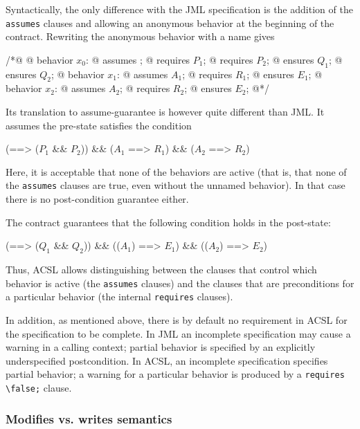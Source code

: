 \noindent
Syntactically, the only difference with the JML specification is the
addition of the \lstinline|assumes| clauses and allowing an 
anonymous behavior at the beginning of the contract. Rewriting the anonymous behavior with a name gives

\begin{listing}{1}
	/*@ 
	@ behavior $x_0$:
	@   assumes \true;
	@   requires $P_1$;
	@   requires $P_2$;
	@   ensures  $Q_1$;
	@   ensures  $Q_2$;
	@ behavior $x_1$:
	@   assumes $A_1$;
	@   requires $R_1$;
	@   ensures $E_1$;
	@ behavior $x_2$:
	@   assumes $A_2$;
	@   requires $R_2$;
	@   ensures $E_2$;
	@*/
\end{listing}

\noindent
Its translation to assume-guarantee is however quite different than JML.
It assumes the pre-state satisfies the condition

\begin{listing-nonumber}
  (\true ==> ($P_1$ && $P_2$)) && ($A_1$ ==> $R_1$) && ($A_2$ ==> $R_2$)
\end{listing-nonumber}
Here, it is acceptable that none of the behaviors are active (that is, that none of the \lstinline|assumes| clauses are true, even without the unnamed behavior). In that case there is no post-condition guarantee either.

The contract guarantees that the following condition holds in the post-state:

\begin{listing-nonumber}
(\true ==> ($Q_1$ && $Q_2$)) && (\old($A_1$) ==> $E_1$) && (\old($A_2$) ==> $E_2$)
\end{listing-nonumber}

Thus, ACSL allows distinguishing between the clauses that control
which behavior is active (the \lstinline|assumes| clauses) and the
clauses that are preconditions for a particular behavior (the internal
\lstinline|requires| clauses). 

In addition, as mentioned above, there is
by default no requirement in ACSL for the specification to be complete. In JML an incomplete specification may cause a warning in a calling context; partial behavior is specified by an explicitly underspecified postcondition. In ACSL, an incomplete specification specifies partial behavior; a warning for a particular behavior is produced by a \lstinline|requires \false;| clause.

\subsubsection*{Modifies vs. writes semantics}



